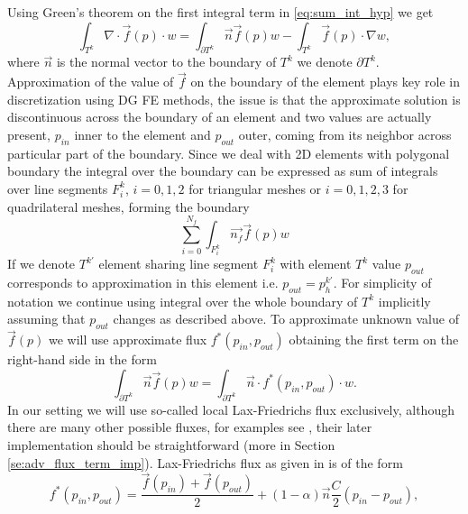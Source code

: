 Using Green's theorem on the first integral term in \eqref{eq:sum_int_hyp} we 
get
\begin{equation}
    \label{eq:hyp_term}
    \int_{T^k} \nabla\cdot \vec{f}(p)\cdot w = %
    \int_{\partial{T^k}} \vec{n}\vec{f}(p)w - \int_{T^k} \vec{f}(p)\cdot\nabla w,
\end{equation}
where $\vec{n}$ is the normal vector to the boundary of $T^k$ we denote 
$\partial T^k$. Approximation of the value of $\vec{f}$ on the boundary of the 
element plays key role in discretization using DG FE methods, the issue is 
that the approximate solution is discontinuous across the boundary of an 
element and two values are actually present, $p_{in}$ inner to the element and 
$p_{out}$ outer, coming from its neighbor across particular part of the 
boundary. Since we deal with 2D 
elements with polygonal boundary the integral over the boundary can be expressed as sum 
of integrals over line segments ${F^k_i}$, $i=0,1,2$ for triangular meshes or 
$i=0,1,2,3$ for quadrilateral meshes, forming the boundary
\begin{equation}
    \sum_{i=0}^{N_f} \int_{F^k_i} \vec{n_f}\vec{f}(p)w
\end{equation}
If we denote $T^{k'}$ element sharing line segment $F^k_i$ with element $T^k$
value $p_{out}$ corresponds to approximation in this element i.e. $p_{out} = 
p^{k'}_h$. For simplicity of notation we continue using integral over the whole 
boundary of $T^k$ implicitly assuming that $p_{out}$ changes as described above. To 
approximate unknown value of $\vec{f}(p)$  we will use approximate flux $f^*(p_{in}, 
p_{out})$ obtaining the first term on the right-hand side in the form
\begin{equation}
    \label{eq:flux_integral}
    \int_{\partial{T^k}} \vec{n}\vec{f}(p)w = \int_{\partial{T^k}} \vec{n} 
    \cdot f^{*} (p_{in}, p_{out})\cdot w.
\end{equation}
In our setting we will use so-called local Lax-Friedrichs flux 
exclusively, although there are many other possible fluxes, for examples see 
\cite{Kucera, Cockburn2001a}, their later implementation should be straightforward (more 
in Section \ref{se:adv_flux_term_imp}). Lax-Friedrichs flux as given in 
\cite{Hesthaven2008} 
is of the form
\begin{equation}
    \label{eq:lax-frieflux}
    f^{*}(p_{in}, p_{out}) =   \frac{\vec{f}(p_{in}) + \vec{f}(p_{out})}{2}  + (1-\alpha) \vec{n}\frac{C}{2}(p_{in} - 
    p_{out}),
\end{equation}
